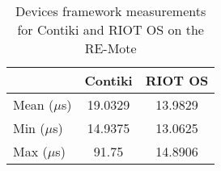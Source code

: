 \begin{table}[!ht]
  \centering
  \begin{tabular}{l|c|c}
                & Contiki  & RIOT OS \\ \hline
  Mean ($\mu$s) & 19.0329  & 13.9829 \\
  Min  ($\mu$s) & 14.9375  & 13.0625 \\
  Max  ($\mu$s) & 91.75    & 14.8906
  \end{tabular}
  \caption{Devices framework measurements for Contiki and RIOT OS on the RE-Mote}
  \label{tab:devices-framework-remote}
  \end{table}